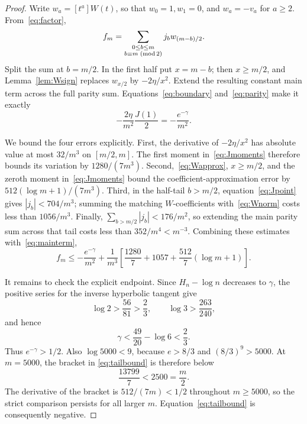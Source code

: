 \documentclass[11pt]{amsart}
\theoremstyle{remark}
\begin{document}
\begin{proof}
Write \(w_a=[t^a]W(t)\), so that \(w_0=1,w_1=0\), and
\(w_a=-v_a\) for \(a\ge2\). From~\eqref{eq:factor},
\begin{equation}\label{eq:conv}
 f_m=\sum_{\substack{0\le b\le m\\b\equiv m\;({\rm mod}\,2)}}
 j_bw_{(m-b)/2}.
\end{equation}
Split the sum at \(b=m/2\). In the first half put \(x=m-b\); then
\(x\ge m/2\), and Lemma~\ref{lem:Wsign} replaces \(w_{x/2}\) by
\(-2\eta/x^2\). Extend the resulting constant main term across the full
parity sum. Equations~\eqref{eq:boundary} and~\eqref{eq:parity} make it
exactly
\begin{equation}\label{eq:mainterm}
 -\frac{2\eta}{m^2}\frac{J(1)}2=-\frac{e^{-\gamma}}{m^2}.
\end{equation}

We bound the four errors explicitly. First, the derivative of
\(-2\eta/x^2\) has absolute value at most \(32/m^3\) on
\([m/2,m]\). The first moment in~\eqref{eq:Jmoments} therefore bounds its
variation by \(1280/(7m^3)\). Second,~\eqref{eq:Wapprox}, \(x\ge m/2\),
and the zeroth moment in~\eqref{eq:Jmoments} bound the
coefficient-approximation error by
\(512(\log m+1)/(7m^3)\). Third, in the half-tail \(b>m/2\),
equation~\eqref{eq:Jpoint} gives \(|j_b|<704/m^3\); summing the matching
\(W\)-coefficients with~\eqref{eq:Wnorm} costs less than \(1056/m^3\).
Finally, \(\sum_{b>m/2}|j_b|<176/m^2\), so extending the main parity sum
across that tail costs less than \(352/m^4<m^{-3}\). Combining these
estimates with~\eqref{eq:mainterm},
\begin{equation}\label{eq:tailbound}
 f_m\le-\frac{e^{-\gamma}}{m^2}
 +\frac1{m^3}\left[
 \frac{1280}{7}+1057+\frac{512}{7}(\log m+1)\right].
\end{equation}

It remains to check the explicit endpoint. Since \(H_n-\log n\) decreases
to \(\gamma\), the positive series for the inverse hyperbolic tangent give
\[
 \log2>\frac{56}{81}>\frac23,
 \qquad
 \log3>\frac{263}{240},
\]
and hence
\[
 \gamma<\frac{49}{20}-\log6<\frac23.
\]
Thus \(e^{-\gamma}>1/2\). Also \(\log5000<9\), because
\(e>8/3\) and \((8/3)^9>5000\). At \(m=5000\), the bracket in
\eqref{eq:tailbound} is therefore below
\[
 \frac{13799}{7}<2500=\frac m2.
\]
The derivative of the bracket is \(512/(7m)<1/2\) throughout
\(m\ge5000\), so the strict comparison persists for all larger \(m\).
Equation~\eqref{eq:tailbound} is consequently negative.
\end{proof}
\end{document}
